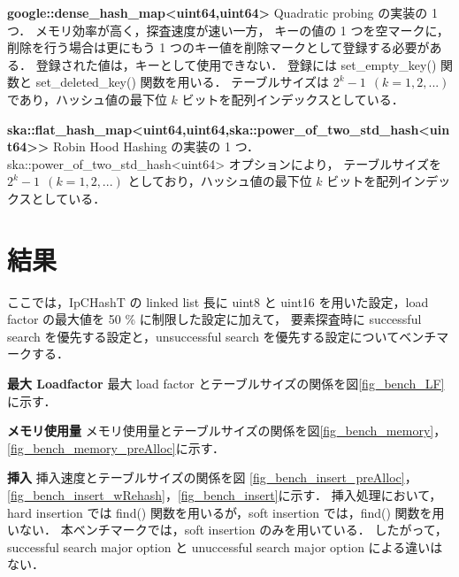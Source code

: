 %
{\bf google::dense\_hash\_map<uint64,uint64>}
\samepage\newline\indent
Quadratic probing の実装の 1 つ．
メモリ効率が高く，探査速度が速い一方，
キーの値の 1 つを空マークに，削除を行う場合は更にもう 1 つのキー値を削除マークとして登録する必要がある．
登録された値は，キーとして使用できない．
登録には set\_empty\_key() 関数と set\_deleted\_key() 関数を用いる．
テーブルサイズは $2^k-1\ \ (k=1,2,...)$ であり，ハッシュ値の最下位 $k$ ビットを配列インデックスとしている．
\leavevmode \newline

%
{\bf ska::flat\_hash\_map<uint64,uint64,ska::power\_of\_two\_std\_hash<uint64>>}
\samepage\newline\indent
Robin Hood Hashing の実装の 1 つ．
ska::power\_of\_two\_std\_hash<uint64> オプションにより，
テーブルサイズを $2^k-1\ \ (k=1,2,...)$ としており，ハッシュ値の最下位 $k$ ビットを配列インデックスとしている．
\leavevmode \newline


\section{結果}
ここでは，IpCHashT の linked list 長に uint8 と uint16 を用いた設定，load factor の最大値を 50 \% に制限した設定に加えて，
要素探査時に successful search を優先する設定と，unsuccessful search を優先する設定についてベンチマークする．
\leavevmode \newline

%
{\bf 最大 Loadfactor}
\samepage\newline\indent
最大 load factor とテーブルサイズの関係を図\ref{fig_bench_LF}に示す．
\leavevmode \newline

%
{\bf メモリ使用量}
\samepage\newline\indent
メモリ使用量とテーブルサイズの関係を図\ref{fig_bench_memory}，\ref{fig_bench_memory_preAlloc}に示す．
\leavevmode \newline

%
{\bf 挿入}
\samepage\newline\indent
挿入速度とテーブルサイズの関係を図
\ref{fig_bench_insert_preAlloc}，\ref{fig_bench_insert_wRehash}，\ref{fig_bench_insert}に示す．
挿入処理において，hard insertion では find() 関数を用いるが，soft insertion では，find() 関数を用いない．
本ベンチマークでは，soft insertion のみを用いている．
したがって，successful search major option と unuccessful search major option による違いはない．
\leavevmode \newline


